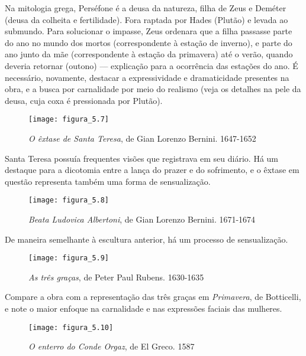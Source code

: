 Na mitologia grega, Perséfone é a deusa da natureza, filha de Zeus e Deméter (deusa da colheita e fertilidade). Fora raptada por Hades (Plutão) e levada ao submundo. Para solucionar o impasse, Zeus ordenara que a filha passasse parte do ano no mundo dos mortos (correspondente à estação de inverno), e parte do ano junto da mãe (correspondente à estação da primavera) até o verão, quando deveria retornar (outono) — explicação para a ocorrência das estações do ano. É necessário, novamente, destacar a expressividade e dramaticidade presentes na obra, e a busca por carnalidade por meio do realismo (veja os detalhes na pele da deusa, cuja coxa é pressionada por Plutão).

\newpage

\begin{figure}[h]
\texttt{[image: figura\_5.7]}
\caption{\textit{O êxtase de Santa Teresa}, de Gian Lorenzo Bernini. 1647-1652}
\label{fig:mesh5.7}
\end{figure}

Santa Teresa possuía frequentes visões que registrava em seu diário. Há um destaque para a dicotomia entre a lança do prazer e do sofrimento, e o êxtase em questão representa também uma forma de sensualização.

\newpage

\begin{figure}[h]
\texttt{[image: figura\_5.8]}
\caption{\textit{Beata Ludovica Albertoni}, de Gian Lorenzo Bernini. 1671-1674}
\label{fig:mesh5.8}
\end{figure}

De maneira semelhante à escultura anterior, há um processo de sensualização.

\newpage

\begin{figure}[h]
\texttt{[image: figura\_5.9]}
\caption{\textit{As três graças}, de Peter Paul Rubens. 1630-1635}
\label{fig:mesh5.9}
\end{figure}

Compare a obra com a representação das três graças em \textit{Primavera}, de Botticelli, e note o maior enfoque na carnalidade e nas expressões faciais das mulheres.

\newpage

\begin{figure}[h]
\texttt{[image: figura\_5.10]}
\caption{\textit{O enterro do Conde Orgaz}, de El Greco. 1587}
\label{fig:mesh5.10}
\end{figure}

